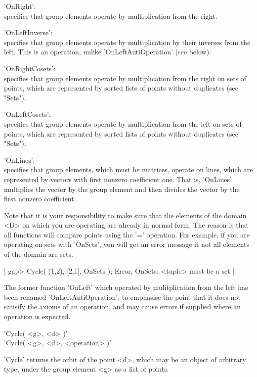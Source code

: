 'OnRight':\\
        specifies that group elements operate by multiplication from  the
        right.

'OnLeftInverse':\\  
	specifies that group elements operate  by multiplication by their
	inverses   from the    left.   This  is    an operation,   unlike
	'OnLeftAntiOperation' (see below).

'OnRightCosets':\\
        specifies that group elements operate by multiplication from  the
        right on sets of points, which are represented by sorted lists of
        points without duplicates (see "Sets").

'OnLeftCosets':\\
        specifies that group elements operate by multiplication from  the
        left  on sets of points, which are represented by sorted lists of
        points without duplicates (see "Sets").

'OnLines':\\
        specifies that group elements, which must be matrices, operate on
        lines,  which are  represented  by  vectors  with  first  nonzero
        coefficient one.  That is, 'OnLines' multiplies the vector by the
        group  element and  then divides  the vector by the first nonzero
        coefficient.

Note that it is your responsibility to make sure that the elements of the
domain <D> on which you  are  operating  are already in normal form.  The
reason is that all functions will compare points using the '=' operation.
For example, if you are operating on sets  with 'OnSets', you will get an
error message it not all elements of the domain are sets.

|    gap> Cycle( (1,2), [2,1], OnSets );
    Error, OnSets: <tuple> must be a set |

The former  function 'OnLeft' which  operated  by mulitplication from the
left has been renamed  'OnLeftAntiOperation', to emphasise the point that
it does not satisify the axioms of an operation, and  may cause errors if
supplied where an operation is expected.


'Cycle( <g>, <d> )' \\
'Cycle( <g>, <d>, <operation> )'

'Cycle' returns the orbit  of the point <d>,  which may be  an  object of
arbitrary type, under the group element <g> as a list of points.

